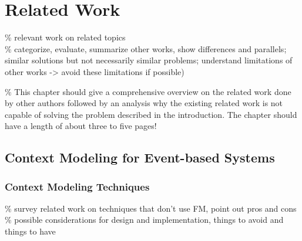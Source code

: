 


\chapter{Related Work}
\% relevant work on related topics \\
\% categorize, evaluate, summarize other works, show differences and parallels; similar solutions but not necessarily similar problems; understand limitations of other works -> avoid these limitations if possible)

\% This chapter should give a comprehensive overview on the related work done by other authors followed by an analysis why the existing related work is not capable of solving the problem described in the introduction. The chapter should have a length of about three to five pages!

\section{Context Modeling for Event-based Systems}

\subsection{Context Modeling Techniques}
\% survey related work on techniques that don't use FM, point out pros and cons \\
\% possible considerations for design and implementation, things to avoid and things to have \\ \\

